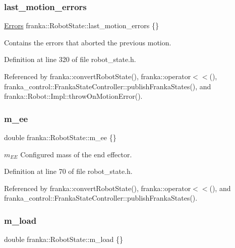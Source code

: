 \subsubsection{\texorpdfstring{last\+\_\+motion\+\_\+errors}{last\_motion\_errors}}
{\footnotesize\ttfamily \hyperlink{structfranka_1_1Errors}{Errors} franka\+::\+Robot\+State\+::last\+\_\+motion\+\_\+errors \{\}}

Contains the errors that aborted the previous motion. 

Definition at line 320 of file robot\+\_\+state.\+h.



Referenced by franka\+::convert\+Robot\+State(), franka\+::operator$<$$<$(), franka\+\_\+control\+::\+Franka\+State\+Controller\+::publish\+Franka\+States(), and franka\+::\+Robot\+::\+Impl\+::throw\+On\+Motion\+Error().

\mbox{\label{structfranka_1_1RobotState_af982a16246e33c1495ec02972a36bce3}} 
\subsubsection{\texorpdfstring{m\+\_\+ee}{m\_ee}}
{\footnotesize\ttfamily double franka\+::\+Robot\+State\+::m\+\_\+ee \{\}}

$m_{EE}$ Configured mass of the end effector. 

Definition at line 70 of file robot\+\_\+state.\+h.



Referenced by franka\+::convert\+Robot\+State(), franka\+::operator$<$$<$(), and franka\+\_\+control\+::\+Franka\+State\+Controller\+::publish\+Franka\+States().

\mbox{\label{structfranka_1_1RobotState_a99ea4ab9c5a42a5c17365ed8fd730cd1}} 
\subsubsection{\texorpdfstring{m\+\_\+load}{m\_load}}
{\footnotesize\ttfamily double franka\+::\+Robot\+State\+::m\+\_\+load \{\}}


